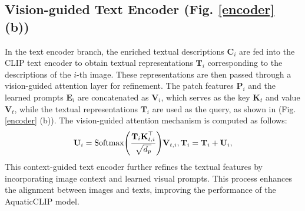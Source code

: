 \subsection{Vision-guided Text Encoder (Fig. \ref{encoder} (b))}
\label{sec:vgte}
In the text encoder branch, the enriched textual descriptions $\textbf{C}_{i}$ are fed into the CLIP text encoder to obtain textual representations $\textbf{T}_{i}$  corresponding to the descriptions of the $i$-th image. 
These representations are then passed through a vision-guided attention layer for refinement. 
The patch features $\textbf{P}_{i}$ and the learned prompts $\textbf{E}_{i}$ are concatenated as $\textbf{V}_i$, which serves as the key $\textbf{K}_{t}$ and value $\textbf{V}_{t}$, while the textual representations $\textbf{T}_{i}$ are used as the query, as shown in (Fig. \ref{encoder} (b)).
The vision-guided attention mechanism is computed as follows:
\begin{equation}
\textbf{U}_{i}=\textrm{Softmax} \Bigg( \frac{\textbf{T}_{i}\textbf{K}_{t,i}^\top}{\sqrt{d_{p}}}\Bigg)\textbf{V}_{t,i},\\
\textbf{T}_{i}=\textbf{T}_{i}+\textbf{U}_i,
\label{eqn}
\end{equation}
\noindent This context-guided text encoder further refines the textual features by incorporating image context and learned visual prompts.
This process enhances the alignment between images and texts, improving the performance of the AquaticCLIP model.

